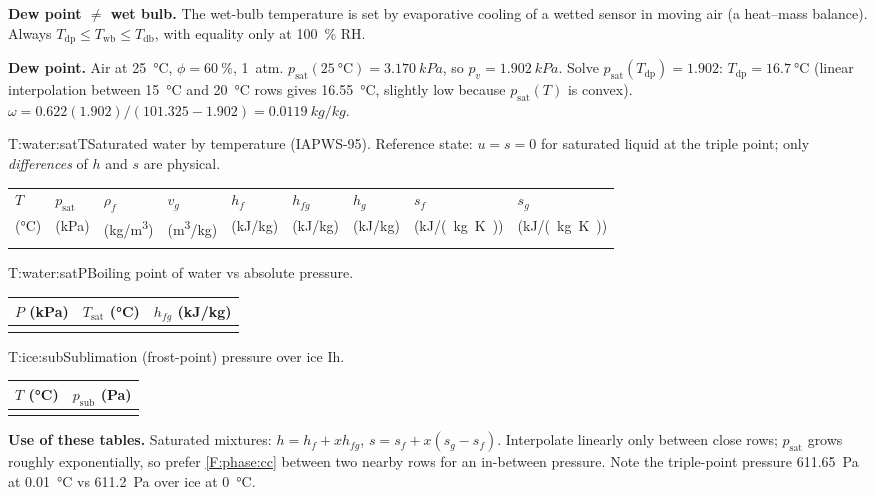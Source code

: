 \begin{multicols}{2}
\textbf{Dew point $\ne$ wet bulb.} The wet-bulb temperature is set by evaporative cooling of a wetted sensor in moving air (a heat--mass balance). Always $T_{\text{dp}}\le T_{\text{wb}}\le T_{\text{db}}$, with equality only at \SI{100}{\percent} RH.

\begin{demobox}\textbf{Dew point.} Air at \SI{25}{\celsius}, $\phi=\SI{60}{\percent}$, 1~atm. $p_{\text{sat}}(\SI{25}{\celsius})=\SI{3.170}{kPa}$, so $p_v=\SI{1.902}{kPa}$. Solve $p_{\text{sat}}(T_{\text{dp}})=1.902$: $T_{\text{dp}}=\SI{16.7}{\celsius}$ (linear interpolation between \SI{15}{\celsius} and \SI{20}{\celsius} rows gives \SI{16.55}{\celsius}, slightly low because $p_{\text{sat}}(T)$ is convex). $\omega=0.622(1.902)/(101.325-1.902)=\SI{0.0119}{kg/kg}$.\end{demobox}
\end{multicols}

\begin{reftab}{T:water:satT}{Saturated water by temperature (IAPWS-95). Reference state: $u=s=0$ for saturated liquid at the triple point; only \emph{differences} of $h$ and $s$ are physical.}
\small
\begin{tabularx}{\textwidth}{@{}YYYYYYYYY@{}}
\toprule
$T$ & $p_{\text{sat}}$ & $\rho_f$ & $v_g$ & $h_f$ & $h_{fg}$ & $h_g$ & $s_f$ & $s_g$\\
(\si{\celsius}) & (\si{kPa}) & (\si{kg/m^3}) & (\si{m^3/kg}) & (\si{kJ/kg}) & (\si{kJ/kg}) & (\si{kJ/kg}) & (\si{kJ/(kg.K)}) & (\si{kJ/(kg.K)})\\
\midrule
{}
\bottomrule
\end{tabularx}\end{reftab}

\begin{multicols}{2}
\begin{reftab}{T:water:satP}{Boiling point of water vs absolute pressure.}
\small
\begin{tabularx}{\linewidth}{@{}YYY@{}}
\toprule
$P$ (\si{kPa}) & $T_{\text{sat}}$ (\si{\celsius}) & $h_{fg}$ (\si{kJ/kg})\\
\midrule
{}
\bottomrule
\end{tabularx}\end{reftab}

\columnbreak
\begin{reftab}{T:ice:sub}{Sublimation (frost-point) pressure over ice Ih.}
\small
\begin{tabularx}{\linewidth}{@{}YY@{}}
\toprule
$T$ (\si{\celsius}) & $p_{\text{sub}}$ (\si{Pa})\\
\midrule
{}
\bottomrule
\end{tabularx}\end{reftab}

\textbf{Use of these tables.} Saturated mixtures: $h=h_f+xh_{fg}$, $s=s_f+x(s_g-s_f)$. Interpolate linearly only between close rows; $p_{\text{sat}}$ grows roughly exponentially, so prefer \eqref{F:phase:cc} between two nearby rows for an in-between pressure. Note the triple-point pressure \SI{611.65}{Pa} at \SI{0.01}{\celsius} vs \SI{611.2}{Pa} over ice at \SI{0}{\celsius}.
\end{multicols}
